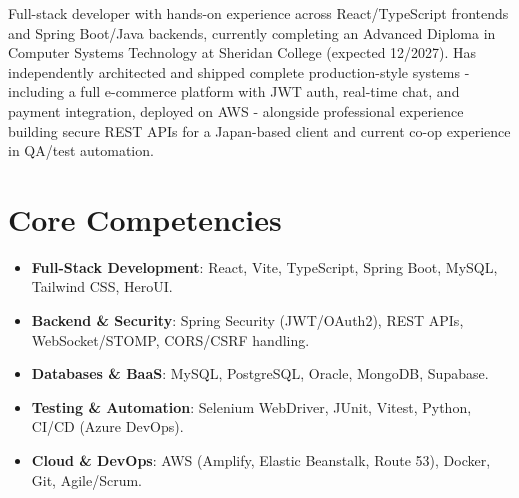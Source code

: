 \documentclass[11pt,a4paper,sans]{moderncv}
\begin{document}
\makecvtitle


\vspace{6pt}
\small{Full-stack developer with hands-on experience across React/TypeScript frontends and Spring Boot/Java backends, currently completing an Advanced Diploma in Computer Systems Technology at Sheridan College (expected 12/2027). Has independently architected and shipped complete production-style systems - including a full e-commerce platform with JWT auth, real-time chat, and payment integration, deployed on AWS - alongside professional experience building secure REST APIs for a Japan-based client and current co-op experience in QA/test automation.}


\section{Core Competencies}
\vspace{1pt}
\begin{itemize}

\item \textbf{Full-Stack Development}: React, Vite, TypeScript, Spring Boot, MySQL, Tailwind CSS, HeroUI.

\item \textbf{Backend \& Security}: Spring Security (JWT/OAuth2), REST APIs, WebSocket/STOMP, CORS/CSRF handling.

\item \textbf{Databases \& BaaS}: MySQL, PostgreSQL, Oracle, MongoDB, Supabase.

\item \textbf{Testing \& Automation}: Selenium WebDriver, JUnit, Vitest, Python, CI/CD (Azure DevOps).

\item \textbf{Cloud \& DevOps}: AWS (Amplify, Elastic Beanstalk, Route 53), Docker, Git, Agile/Scrum.

\end{itemize}

\end{document}

